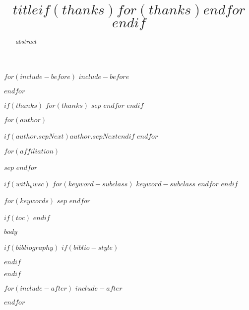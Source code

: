 \documentclass[$journal$]{imsart}
\numberwithin{equation}{section}
\theoremstyle{plain}
\theoremstyle{remark}
\begin{document}
$for(include-before)$
$include-before$

$endfor$


\begin{frontmatter}
\title{$title$$if(thanks)$$for(thanks)$$endfor$$endif$}

$if(thanks)$
$for(thanks)$
$sep$
$endfor$
$endif$


\begin{aug}


$for(author)$
\author[$author.addressLabel$]{ 
  }
  $if(author.sepNext)$$author.sepNext$$endif$
$endfor$

$for(affiliation)$
\address[$affiliation.label$]{$affiliation.name$,
  }
$sep$
$endfor$
\end{aug}

\begin{abstract}
$abstract$
\end{abstract}

$if(with_kwsc)$
$for(keyword-subclass)$
$keyword-subclass$
$endfor$
$endif$

\begin{keyword}
$for(keywords)$
$sep$
$endfor$
\end{keyword}

\end{frontmatter}

$if(toc)$
\tableofcontents
$endif$

$body$

$if(bibliography)$
$if(biblio-style)$

$endif$

$endif$

$for(include-after)$
$include-after$

$endfor$
\end{document}
